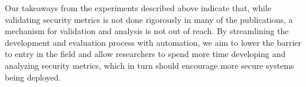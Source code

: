 Our takeaways from the experiments described above indicate that, while validating security metrics is not done rigorously in many of the publications, a mechanism for validation and analysis is not out of reach. By streamlining the development and evaluation process with automation, we aim to lower the barrier to entry in the field and allow researchers to spend more time developing and analyzing security metrics, which in turn should encourage more secure systems being deployed. 



